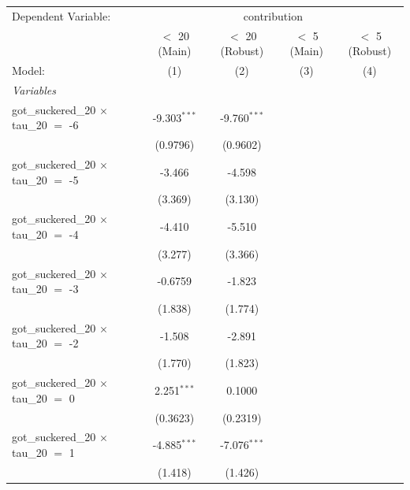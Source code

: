
\begingroup
\centering
\begin{tabular}{lcccc}
   \tabularnewline \midrule \midrule
   Dependent Variable: & \multicolumn{4}{c}{contribution}\\
                                                 & $<$ 20 (Main)  & $<$ 20 (Robust) & $<$ 5 (Main)   & $<$ 5 (Robust) \\   
   Model:                                        & (1)            & (2)             & (3)            & (4)\\  
   \midrule
   \emph{Variables}\\
   got\_suckered\_20 $\times$ tau\_20 $=$ -6     & -9.303$^{***}$ & -9.760$^{***}$  &                &   \\   
                                                 & (0.9796)       & (0.9602)        &                &   \\   
   got\_suckered\_20 $\times$ tau\_20 $=$ -5     & -3.466         & -4.598          &                &   \\   
                                                 & (3.369)        & (3.130)         &                &   \\   
   got\_suckered\_20 $\times$ tau\_20 $=$ -4     & -4.410         & -5.510          &                &   \\   
                                                 & (3.277)        & (3.366)         &                &   \\   
   got\_suckered\_20 $\times$ tau\_20 $=$ -3     & -0.6759        & -1.823          &                &   \\   
                                                 & (1.838)        & (1.774)         &                &   \\   
   got\_suckered\_20 $\times$ tau\_20 $=$ -2     & -1.508         & -2.891          &                &   \\   
                                                 & (1.770)        & (1.823)         &                &   \\   
   got\_suckered\_20 $\times$ tau\_20 $=$ 0      & 2.251$^{***}$  & 0.1000          &                &   \\   
                                                 & (0.3623)       & (0.2319)        &                &   \\   
   got\_suckered\_20 $\times$ tau\_20 $=$ 1      & -4.885$^{***}$ & -7.076$^{***}$  &                &   \\   
                                                 & (1.418)        & (1.426)         &                &   \\   

\end{tabular}
